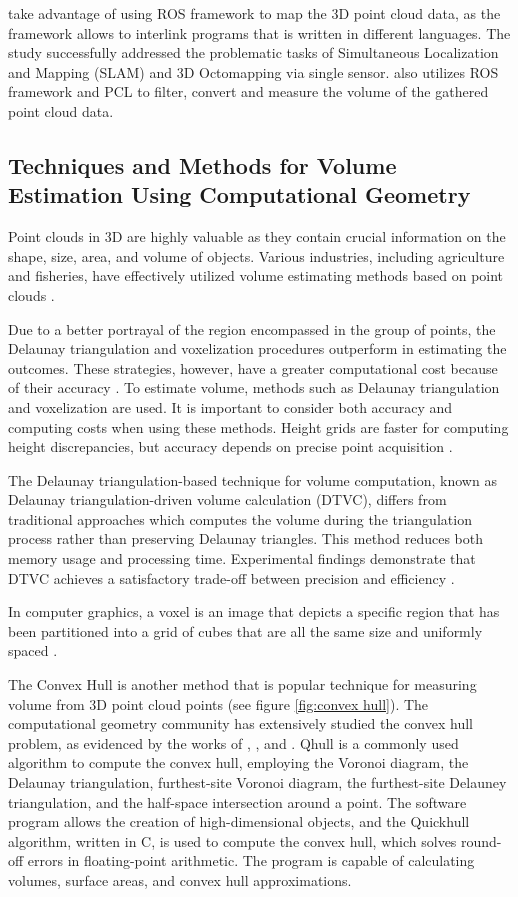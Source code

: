 \citet{ocando2017} take advantage of using ROS framework to map the 3D point cloud data, as the framework allows to interlink programs that is written in different languages. The study successfully addressed the problematic tasks of Simultaneous Localization and Mapping (SLAM) and 3D Octomapping via single sensor. \citet{clar2022} also utilizes ROS framework and PCL to filter, convert and measure the volume of the gathered point cloud data.

\subsection{Techniques and Methods for Volume Estimation Using Computational Geometry}

Point clouds in 3D are highly valuable as they contain crucial information on the shape, size, area, and volume of objects. Various industries, including agriculture and fisheries, have effectively utilized volume estimating methods based on point clouds \citep{geuvara2020}.

Due to a better portrayal of the region encompassed in the group of points, the Delaunay triangulation and voxelization procedures outperform in estimating the outcomes. These strategies, however, have a greater computational cost because of their accuracy \citep{chee2015}. To estimate volume, methods such as Delaunay triangulation and voxelization are used. It is important to consider both accuracy and computing costs when using these methods. Height grids are faster for computing height discrepancies, but accuracy depends on precise point acquisition \citep{bewley2011, duff2000}.

The Delaunay triangulation-based technique for volume computation, known as Delaunay triangulation-driven volume calculation (DTVC), differs from traditional approaches which computes the volume during the triangulation process rather than preserving Delaunay triangles. This method reduces both memory usage and processing time. Experimental findings demonstrate that DTVC achieves a satisfactory trade-off between precision and efficiency \citep{liuY2021}.

In computer graphics, a voxel is an image that depicts a specific region that has been partitioned into a grid of cubes that are all the same size and uniformly spaced \citep{putman2018}.

The Convex Hull is another method that is popular technique for measuring volume from 3D point cloud points (see figure \ref{fig:convex hull}). The computational geometry community has extensively studied the convex hull problem, as evidenced by the works of \citet{kim2002}, \citet{graham1983}, and \citet{maus1984}. Qhull is a commonly used algorithm to compute the convex hull, employing the Voronoi diagram, the Delaunay triangulation, furthest-site Voronoi diagram, the furthest-site Delauney triangulation, and the half-space intersection around a point. The software program allows the creation of high-dimensional objects, and the Quickhull algorithm, written in C, is used to compute the convex hull, which solves round-off errors in floating-point arithmetic. The program is capable of calculating volumes, surface areas, and convex hull approximations.

